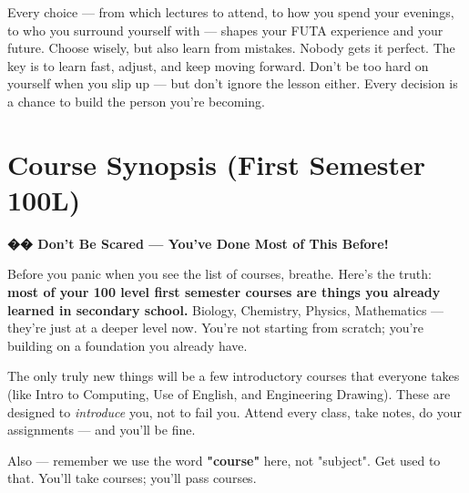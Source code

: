 \documentclass[11pt,a4paper]{article}
\begin{document}
\begin{tcolorbox}[colback=lightGray,colframe=primary,title={\color{white}\textbf{Own Your Decisions}},colbacktitle=primary,arc=4pt,breakable]
Every choice --- from which lectures to attend, to how you spend your evenings, to who you surround yourself with --- shapes your FUTA experience and your future. Choose wisely, but also learn from mistakes. Nobody gets it perfect. The key is to learn fast, adjust, and keep moving forward. Don't be too hard on yourself when you slip up --- but don't ignore the lesson either. Every decision is a chance to build the person you're becoming.
\end{tcolorbox}

\newpage
\section{Course Synopsis (First Semester 100L)}

\begin{inspirational}
    \textbf{\color{primary}\Large �� Don't Be Scared --- You've Done Most of This Before!}

    \vspace{0.5em}

    Before you panic when you see the list of courses, breathe. Here's the truth: \textbf{most of your 100 level first semester courses are things you already learned in secondary school.} Biology, Chemistry, Physics, Mathematics --- they're just at a deeper level now. You're not starting from scratch; you're building on a foundation you already have.

    \vspace{0.5em}

    The only truly new things will be a few introductory courses that everyone takes (like Intro to Computing, Use of English, and Engineering Drawing). These are designed to \textit{introduce} you, not to fail you. Attend every class, take notes, do your assignments --- and you'll be fine.

    \vspace{0.5em}

    Also --- remember we use the word \textbf{"course"} here, not "subject". Get used to that. You'll take courses; you'll pass courses.
\end{inspirational}
\end{document}
